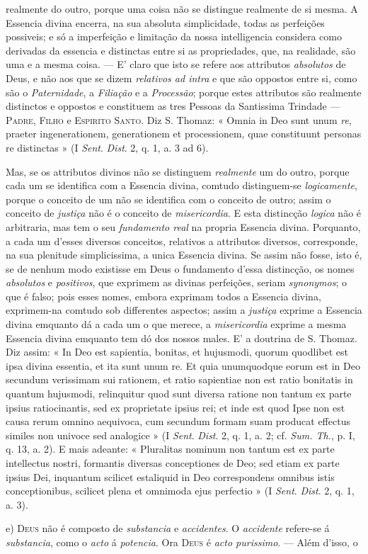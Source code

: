 realmente do outro, porque uma coisa não se distingue realmente de si mesma. A Essencia divina encerra, na sua absoluta simplicidade, todas as perfeições possiveis; e só a imperfeição e limitação da nossa intelligencia considera como derivadas da essencia e distinctas entre si as propriedades, que, na realidade, são uma e a mesma coisa. --- E' claro que isto se refere aos attributos \emph{absolutos} de Deus, e não aos que se dizem \emph{relativos ad intra} e que são oppostos entre si, como são o \emph{Paternidade}, a \emph{Filiação} e a \emph{Processão}; porque estes attributos são realmente distinctos e oppostos e constituem as tres Pessoas da Santissima Trindade --- \textsc{Padre}, \textsc{Filho} e \textsc{Espirito Santo}. Diz S. Thomaz: « Omnia in Deo sunt unum \emph{re}, praeter ingenerationem, generationem et processionem, quae constituunt personas re distinctas » (I \emph{Sent}. \emph{Dist}. 2, q. 1, a. 3 ad 6).\par Mas, se os attributos divinos não se distinguem \emph{realmente} um do outro, porque cada um se identifica com a Essencia divina, comtudo distinguem-se \emph{logicamente}, porque o conceito de um não se identifica com o conceito de outro; assim o conceito de \emph{justiça} não é o conceito de \emph{misericordia}. E esta distincção \emph{logica} não é arbitraria, mas tem o seu \emph{fundamento real} na propria Essencia divina. Porquanto, a cada um d'esses diversos conceitos, relativos a attributos diversos, corresponde, na sua plenitude simplicissima, a unica Essencia divina. Se assim não fosse, isto é, se de nenhum modo existisse em Deus o fundamento d'essa distincção, os nomes \emph{absolutos} e \emph{positivos}, que exprimem as divinas perfeições, seriam \emph{synonymos}; o que é falso; pois esses nomes, embora exprimam todos a Essencia divina, exprimem-na comtudo sob differentes aspectos; assim a \emph{justiça} exprime a Essencia divina emquanto dá a cada um o que merece, a \emph{misericordia} exprime a mesma Essencia divina emquanto tem dó dos nossos males. E' a doutrina de S. Thomaz. Diz assim: « In Deo est sapientia, bonitas, et hujusmodi, quorum quodlibet est ipsa divina essentia, et ita sunt unum re. Et quia unumquodque eorum est in Deo secundum verissimam sui rationem, et ratio sapientiae non est ratio bonitatis in quantum hujusmodi, relinquitur quod sunt diversa ratione non tantum ex parte ipsius ratiocinantis, sed ex proprietate ipsius rei; et inde est quod Ipse non est causa rerum omnino aequivoca, cum secundum formam suam producat effectus similes non univoce sed analogice » (I \emph{Sent}. \emph{Dist}. 2, q. 1, a. 2; cf. \emph{Sum. Th.}, p. I, q. 13, a. 2). E mais adeante: « Pluralitas nominum non tantum est ex parte intellectus nostri, formantis diversas conceptiones de Deo; sed etiam ex parte ipsius Dei, inquantum scilicet estaliquid in Deo correspondens omnibus istis conceptionibus, scilicet plena et omnimoda ejus perfectio » (I \emph{Sent}. \emph{Dist}. 2, q. 1, a. 3).\par e) \textsc{Deus} não é composto de \emph{substancia} e \emph{accidentes}. O \emph{accidente} refere-se á \emph{substancia}, como o \emph{acto} á \emph{potencia}. Ora \textsc{Deus} é \emph{acto purissimo}. --- Além d'isso, o 